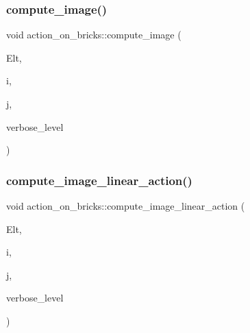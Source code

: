 \subsubsection{\texorpdfstring{compute\+\_\+image()}{compute\_image()}}
{\footnotesize\ttfamily void action\+\_\+on\+\_\+bricks\+::compute\+\_\+image (\begin{DoxyParamCaption}\item[{\mbox{\hyperlink{galois_8h_a09fddde158a3a20bd2dcadb609de11dc}{I\+NT}} $\ast$}]{Elt,  }\item[{\mbox{\hyperlink{galois_8h_a09fddde158a3a20bd2dcadb609de11dc}{I\+NT}}}]{i,  }\item[{\mbox{\hyperlink{galois_8h_a09fddde158a3a20bd2dcadb609de11dc}{I\+NT}} \&}]{j,  }\item[{\mbox{\hyperlink{galois_8h_a09fddde158a3a20bd2dcadb609de11dc}{I\+NT}}}]{verbose\+\_\+level }\end{DoxyParamCaption})}

\mbox{\label{classaction__on__bricks_a63ff64a1a661a7c2b62076ef9ca43416}} 
\subsubsection{\texorpdfstring{compute\+\_\+image\+\_\+linear\+\_\+action()}{compute\_image\_linear\_action()}}
{\footnotesize\ttfamily void action\+\_\+on\+\_\+bricks\+::compute\+\_\+image\+\_\+linear\+\_\+action (\begin{DoxyParamCaption}\item[{\mbox{\hyperlink{galois_8h_a09fddde158a3a20bd2dcadb609de11dc}{I\+NT}} $\ast$}]{Elt,  }\item[{\mbox{\hyperlink{galois_8h_a09fddde158a3a20bd2dcadb609de11dc}{I\+NT}}}]{i,  }\item[{\mbox{\hyperlink{galois_8h_a09fddde158a3a20bd2dcadb609de11dc}{I\+NT}} \&}]{j,  }\item[{\mbox{\hyperlink{galois_8h_a09fddde158a3a20bd2dcadb609de11dc}{I\+NT}}}]{verbose\+\_\+level }\end{DoxyParamCaption})}

\mbox{\label{classaction__on__bricks_a5d60d7aba8eba9f61e76b390f713b1be}} 

